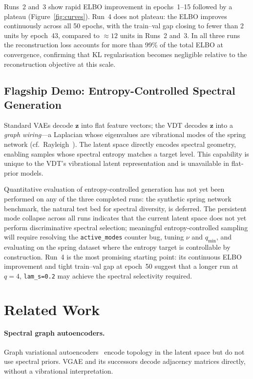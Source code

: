 \documentclass[11pt,a4paper]{article}
\begin{document}
Runs~2 and~3 show rapid ELBO improvement in epochs~1--15 followed by a
plateau (Figure~\ref{fig:curves}).
Run~4 does not plateau: the ELBO improves continuously across all 50 epochs,
with the train--val gap closing to fewer than 2 units by epoch~43, compared
to ${\approx}12$ units in Runs~2 and~3.
In all three runs the reconstruction loss accounts for more than 99\% of the
total ELBO at convergence, confirming that KL regularisation becomes
negligible relative to the reconstruction objective at this scale.

\subsection{Flagship Demo: Entropy-Controlled Spectral Generation}
\label{sec:experiments:demo}

Standard VAEs decode $\mathbf{z}$ into flat feature vectors; the VDT decodes
$\mathbf{z}$ into a \emph{graph wiring}---a Laplacian whose eigenvalues are
vibrational modes of the spring network (cf.\ Rayleigh~\cite{rayleigh1877}).
The latent space directly encodes spectral geometry, enabling samples whose
spectral entropy matches a target level.
This capability is unique to the VDT's vibrational latent representation and
is unavailable in flat-prior models.

Quantitative evaluation of entropy-controlled generation has not yet been
performed on any of the three completed runs: the synthetic spring network
benchmark, the natural test bed for spectral diversity, is deferred.
The persistent mode collapse across all runs indicates that the current latent
space does not yet perform discriminative spectral selection; meaningful
entropy-controlled sampling will require resolving the \texttt{active\_modes}
counter bug, tuning $\nu$ and $q_{\min}$, and evaluating on the spring dataset
where the entropy target is controllable by construction.
Run~4 is the most promising starting point: its continuous ELBO improvement
and tight train--val gap at epoch~50 suggest that a longer run at $q=4$,
\texttt{lam\_s=0.2} may achieve the spectral selectivity required.

\section{Related Work}
\label{sec:related}

\paragraph{Spectral graph autoencoders.}
Graph variational autoencoders~\cite{kipf2016} encode topology in the latent
space but do not use spectral priors.  VGAE and its successors decode
adjacency matrices directly, without a vibrational interpretation.
\end{document}
